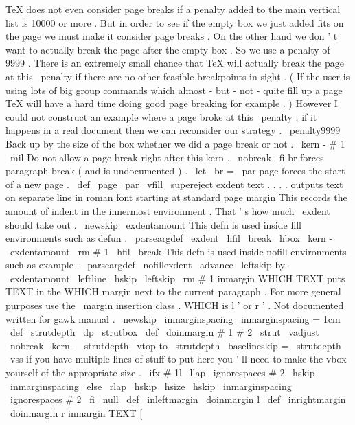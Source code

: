 {{{}
%
%
%
TeX
does
not
even
consider
page
breaks
if
a
penalty
added
to
the
%
main
vertical
list
is
10000
or
more
.
But
in
order
to
see
if
the
%
empty
box
we
just
added
fits
on
the
page
we
must
make
it
consider
%
page
breaks
.
On
the
other
hand
we
don
'
t
want
to
actually
break
the
%
page
after
the
empty
box
.
So
we
use
a
penalty
of
9999
.
%
%
There
is
an
extremely
small
chance
that
TeX
will
actually
break
the
%
page
at
this
\
penalty
if
there
are
no
other
feasible
breakpoints
in
%
sight
.
(
If
the
user
is
using
lots
of
big
group
commands
which
%
almost
-
but
-
not
-
quite
fill
up
a
page
TeX
will
have
a
hard
time
doing
%
good
page
breaking
for
example
.
)
However
I
could
not
construct
an
%
example
where
a
page
broke
at
this
\
penalty
;
if
it
happens
in
a
real
%
document
then
we
can
reconsider
our
strategy
.
\
penalty9999
%
%
Back
up
by
the
size
of
the
box
whether
we
did
a
page
break
or
not
.
\
kern
-
#
1
\
mil
%
%
Do
not
allow
a
page
break
right
after
this
kern
.
\
nobreak
\
fi
}
%
br
forces
paragraph
break
(
and
is
undocumented
)
.
\
let
\
br
=
\
par
%
page
forces
the
start
of
a
new
page
.
%
\
def
\
page
{
\
par
\
vfill
\
supereject
}
%
exdent
text
.
.
.
.
%
outputs
text
on
separate
line
in
roman
font
starting
at
standard
page
margin
%
This
records
the
amount
of
indent
in
the
innermost
environment
.
%
That
'
s
how
much
\
exdent
should
take
out
.
\
newskip
\
exdentamount
%
This
defn
is
used
inside
fill
environments
such
as
defun
.
\
parseargdef
\
exdent
{
\
hfil
\
break
\
hbox
{
\
kern
-
\
exdentamount
{
\
rm
#
1
}
}
\
hfil
\
break
}
%
This
defn
is
used
inside
nofill
environments
such
as
example
.
\
parseargdef
\
nofillexdent
{
{
\
advance
\
leftskip
by
-
\
exdentamount
\
leftline
{
\
hskip
\
leftskip
{
\
rm
#
1
}
}
}
}
%
inmargin
{
WHICH
}
{
TEXT
}
puts
TEXT
in
the
WHICH
margin
next
to
the
current
%
paragraph
.
For
more
general
purposes
use
the
\
margin
insertion
%
class
.
WHICH
is
l
'
or
r
'
.
Not
documented
written
for
gawk
manual
.
%
\
newskip
\
inmarginspacing
\
inmarginspacing
=
1cm
\
def
\
strutdepth
{
\
dp
\
strutbox
}
%
\
def
\
doinmargin
#
1
#
2
{
\
strut
\
vadjust
{
%
\
nobreak
\
kern
-
\
strutdepth
\
vtop
to
\
strutdepth
{
%
\
baselineskip
=
\
strutdepth
\
vss
%
if
you
have
multiple
lines
of
stuff
to
put
here
you
'
ll
need
to
%
make
the
vbox
yourself
of
the
appropriate
size
.
\
ifx
#
1l
%
\
llap
{
\
ignorespaces
#
2
\
hskip
\
inmarginspacing
}
%
\
else
\
rlap
{
\
hskip
\
hsize
\
hskip
\
inmarginspacing
\
ignorespaces
#
2
}
%
\
fi
\
null
}
%
}
}
\
def
\
inleftmargin
{
\
doinmargin
l
}
\
def
\
inrightmargin
{
\
doinmargin
r
}
%
%
inmargin
{
TEXT
[
}}
